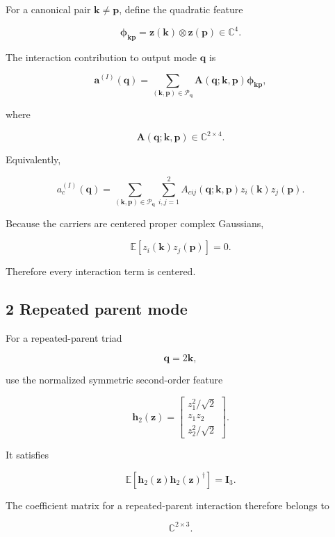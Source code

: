 \documentclass[
  11pt,
  a4paper,
]{article}
\begin{document}
For a canonical pair \(\boldsymbol k\ne\boldsymbol p\), define the
quadratic feature

\[
\boldsymbol\phi_{\boldsymbol k\boldsymbol p}
=
\boldsymbol z(\boldsymbol k)
\otimes
\boldsymbol z(\boldsymbol p)
\in\mathbb C^4.
\]

The interaction contribution to output mode \(\boldsymbol q\) is

\[
\boldsymbol a^{(I)}(\boldsymbol q)
=
\sum_{(\boldsymbol k,\boldsymbol p)\in\mathcal P_{\boldsymbol q}}
\boldsymbol A(\boldsymbol q;\boldsymbol k,\boldsymbol p)
\boldsymbol\phi_{\boldsymbol k\boldsymbol p},
\]

where

\[
\boldsymbol A(\boldsymbol q;\boldsymbol k,\boldsymbol p)
\in\mathbb C^{2\times4}.
\]

Equivalently,

\[
a_c^{(I)}(\boldsymbol q)
=
\sum_{(\boldsymbol k,\boldsymbol p)\in\mathcal P_{\boldsymbol q}}
\sum_{i,j=1}^{2}
A_{cij}(\boldsymbol q;\boldsymbol k,\boldsymbol p)
z_i(\boldsymbol k)z_j(\boldsymbol p).
\]

Because the carriers are centered proper complex Gaussians,

\[
\mathbb E[
z_i(\boldsymbol k)z_j(\boldsymbol p)
]
=
0.
\]

Therefore every interaction term is centered.

\subsection{2 Repeated parent mode}\label{repeated-parent-mode}

For a repeated-parent triad

\[
\boldsymbol q=2\boldsymbol k,
\]

use the normalized symmetric second-order feature

\[
\boldsymbol h_2(\boldsymbol z)
=
\begin{bmatrix}
z_1^2/\sqrt2\\
z_1z_2\\
z_2^2/\sqrt2
\end{bmatrix}.
\]

It satisfies

\[
\mathbb E[
\boldsymbol h_2(\boldsymbol z)
\boldsymbol h_2(\boldsymbol z)^\dagger
]
=
\boldsymbol I_3.
\]

The coefficient matrix for a repeated-parent interaction therefore
belongs to

\[
\mathbb C^{2\times3}.
\]
\end{document}
